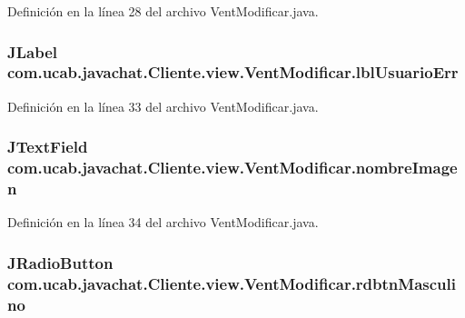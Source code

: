 Definición en la línea 28 del archivo Vent\-Modificar.\-java.

\hypertarget{classcom_1_1ucab_1_1javachat_1_1_cliente_1_1view_1_1_vent_modificar_aab915a5c7399f2bd6ae4a02bf1c15099}{
\subsubsection[{lbl\-Usuario\-Err}]{\setlength{\rightskip}{0pt plus 5cm}J\-Label com.\-ucab.\-javachat.\-Cliente.\-view.\-Vent\-Modificar.\-lbl\-Usuario\-Err}}\label{classcom_1_1ucab_1_1javachat_1_1_cliente_1_1view_1_1_vent_modificar_aab915a5c7399f2bd6ae4a02bf1c15099}


Definición en la línea 33 del archivo Vent\-Modificar.\-java.

\hypertarget{classcom_1_1ucab_1_1javachat_1_1_cliente_1_1view_1_1_vent_modificar_a01c153fadbc0fa1989d904199b8fefe0}{
\subsubsection[{nombre\-Imagen}]{\setlength{\rightskip}{0pt plus 5cm}J\-Text\-Field com.\-ucab.\-javachat.\-Cliente.\-view.\-Vent\-Modificar.\-nombre\-Imagen}}\label{classcom_1_1ucab_1_1javachat_1_1_cliente_1_1view_1_1_vent_modificar_a01c153fadbc0fa1989d904199b8fefe0}


Definición en la línea 34 del archivo Vent\-Modificar.\-java.

\hypertarget{classcom_1_1ucab_1_1javachat_1_1_cliente_1_1view_1_1_vent_modificar_aaace25e8a78f0a63fd8634a08b400cc8}{
\subsubsection[{rdbtn\-Masculino}]{\setlength{\rightskip}{0pt plus 5cm}J\-Radio\-Button com.\-ucab.\-javachat.\-Cliente.\-view.\-Vent\-Modificar.\-rdbtn\-Masculino}}\label{classcom_1_1ucab_1_1javachat_1_1_cliente_1_1view_1_1_vent_modificar_aaace25e8a78f0a63fd8634a08b400cc8}


